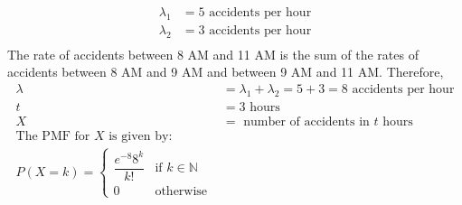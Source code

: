 \documentclass[answers]{exam}
\begin{document}
\begin{questions}
    \begin{solution}
        \begin{align*}
            \lambda_1 & = 5 \text{ accidents per hour} \\
            \lambda_2 & = 3 \text{ accidents per hour} \\
        \end{align*}
        The rate of accidents between 8 AM and 11 AM is the sum of the rates of accidents between 8 AM and 9 AM and
        between 9 AM and 11 AM. Therefore,
        \begin{align*}
            \lambda & = \lambda_1 + \lambda_2 = 5 + 3 = 8 \text{ accidents per hour} \\
            t       & = 3 \text{ hours}                                              \\
            X       & = \text{ number of accidents in } t \text{ hours}              \\
            \text{The PMF for } X \text{ is given by:}                               \\
            P(X = k) = \begin{cases}
                           \dfrac{e^{-8} 8^k}{k!} & \text{if } k \in \mathbb{N} \\
                           0                      & \text{otherwise}
                       \end{cases}
        \end{align*}
    \end{solution}

\end{questions}
\end{document}
